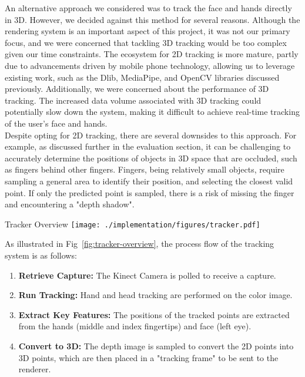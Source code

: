 An alternative approach we considered was to track the face and hands directly in 3D. However, we decided against this method for several reasons. Although the rendering system is an important aspect of this project, it was not our primary focus, and we were concerned that tackling 3D tracking would be too complex given our time constraints. The ecosystem for 2D tracking is more mature, partly due to advancements driven by mobile phone technology, allowing us to leverage existing work, such as the Dlib, MediaPipe, and OpenCV libraries discussed previously. Additionally, we were concerned about the performance of 3D tracking. The increased data volume associated with 3D tracking could potentially slow down the system, making it difficult to achieve real-time tracking of the user's face and hands. \\

Despite opting for 2D tracking, there are several downsides to this approach. For example, as discussed further in the evaluation section, it can be challenging to accurately determine the positions of objects in 3D space that are occluded, such as fingers behind other fingers. Fingers, being relatively small objects, require sampling a general area to identify their position, and selecting the closest valid point. If only the predicted point is sampled, there is a risk of missing the finger and encountering a "depth shadow".

\begin{figureBox}[label={fig:tracker-overview}, width=1.0\linewidth]{Tracker Overview}
    \texttt{[image: ./implementation/figures/tracker.pdf]}
\end{figureBox}

As illustrated in Fig~\ref{fig:tracker-overview}, the process flow of the tracking system is as follows:

\begin{enumerate}[itemsep=-0.25em]
    \item \textbf{Retrieve Capture:} The Kinect Camera is polled to receive a capture.
    \item \textbf{Run Tracking:} Hand and head tracking are performed on the color image.
    \item \textbf{Extract Key Features:} The positions of the tracked points are extracted from the hands (middle and index fingertips) and face (left eye).
    \item \textbf{Convert to 3D:} The depth image is sampled to convert the 2D points into 3D points, which are then placed in a "tracking frame" to be sent to the renderer.
\end{enumerate}

